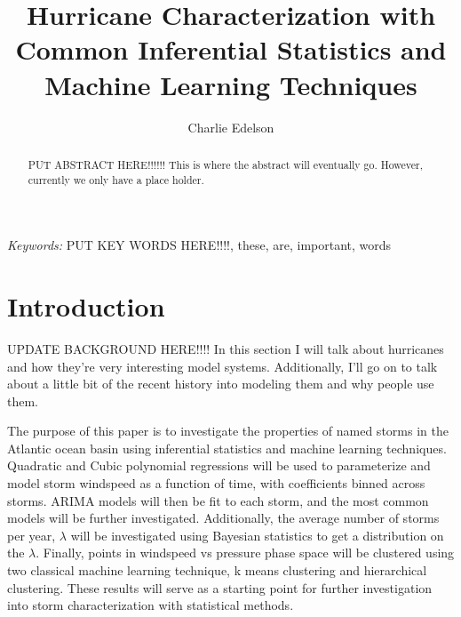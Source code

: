 \documentclass{article}
\title{Hurricane Characterization with Common Inferential Statistics and Machine Learning Techniques}
\author{Charlie Edelson}
\providecommand{\keywords}[1]{\small{\textit{Keywords:} #1}}
\begin{document}
	
	\maketitle

	\begin{abstract}
	PUT ABSTRACT HERE!!!!!! This is where the abstract will eventually go. However, currently we only have a place holder.
	\end{abstract}
	
	\keywords{PUT KEY WORDS HERE!!!!, these, are, important, words}

	\section{Introduction}
	UPDATE BACKGROUND HERE!!!! In this section I will talk about hurricanes and how they're very interesting model systems. Additionally, I'll go on to talk about a little bit of the recent history into modeling them and why people use them.
	
	The purpose of this paper is to investigate the properties of named storms in the Atlantic ocean basin using inferential statistics and machine learning techniques. Quadratic and Cubic polynomial regressions will be used to parameterize and model storm windspeed as a function of time, with coefficients binned across storms. ARIMA models will then be fit to each storm, and the most common models will be further investigated. Additionally, the average number of storms per year, $\lambda$ will be investigated using Bayesian statistics to get a distribution on the $\lambda$. Finally, points in windspeed vs pressure phase space will be clustered using two classical machine learning technique, k means clustering and hierarchical clustering. These results will serve as a starting point for further investigation into storm characterization with statistical methods.
	
\end{document}

